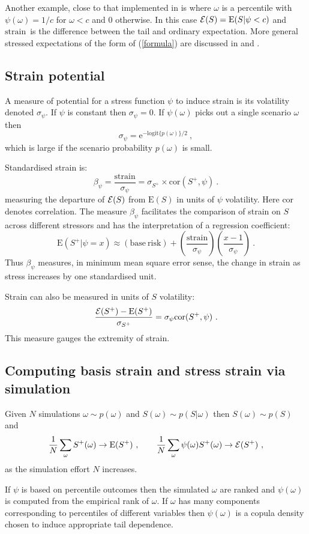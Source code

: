 \documentclass[authoryear]{elsarticle}
\newcommand{\logit}{\mathrm{logit}}
\newcommand{\E}{\mathrm{E}}
\newcommand{\e}{\mathrm{e}}
\newcommand{\Ex}{{\cal E}}
\newcommand{\Es}{\Ex}
\newcommand{\cor}{\mathrm{cor}}
\newcommand{\br}{\ensuremath{\mathrm{base\ risk}}}
\newcommand{\st}{\ensuremath{\mathrm{strain}}}
\newcommand{\pr}{\ensuremath{\mathrm{strain}}}
\newcommand{\eref}[1]{(\ref{#1})}
\newcommand{\cq}{\ , \qquad}
\begin{document}
Another example, close to that implemented in \cite{brownlees2015} is where $\omega$ is a percentile with $\psi(\omega)=1/c$ for $\omega<c$ and 0 otherwise.   In this case  $\Es(S)=\E(S|\psi<c)$ and \pr\  is the difference between the   tail and ordinary expectation.
More general stressed expectations of the form of \eref{formula} are discussed in \cite{furman2008weighted1} and \cite{choo2010determining}.

\subsection{Strain potential} 

A  measure of potential for a stress function $\psi$ to induce strain is its volatility denoted $\sigma_\psi$. If $\psi$ is constant then $\sigma_\psi=0$.   If $\psi(\omega)$ picks out a single scenario $\omega$ then 
$$
\sigma_\psi= \e^{-\logit\{p(\omega)\}/2}\ ,
$$
which is large if the scenario probability $p(\omega)$ is small. 

Standardised strain is: 
$$
\beta_\psi= \frac{\mathrm{strain}}{\sigma_\psi}=\sigma_{S^+} \times\cor(S^+,\psi)\ .
$$
measuring the departure of $\Es(S)$ from $\E(S)$ in units of $\psi$ volatility. Here $\cor$ denotes correlation. The measure $\beta_\psi$ facilitates the comparison of strain on $S$ across different stressors and has the interpretation of a regression coefficient:
$$
\E(S^+|\psi=x) \approx (\br) +\left(\frac{\st}{\sigma_\psi}\right)\left(\frac{x-1}{\sigma_\psi}\right)\ .
$$
Thus $\beta_\psi$ measures, in minimum mean square error sense, the change in strain as stress increases by one standardised unit.

 Strain can also be measured  in units of $S$ volatility:
$$
\frac{\Es(S^+)-\E(S^+)}{\sigma_{S^+}}=\sigma_\psi\cor(S^+,\psi)\ .
$$
This measure gauges the extremity of strain.

\subsection{Computing basis strain and stress strain via simulation}
Given $N$ simulations $\omega\sim p(\omega)$ and $S(\omega)\sim p(S|\omega)$  then  $S(\omega)\sim p(S)$ and  
$$
 \frac{1}{N}\sum_\omega S^+(\omega)\rightarrow \E(S^+) \cq \frac{1}{N}\sum_\omega \psi(\omega)S^+(\omega)\rightarrow \Ex(S^+) \ ,
$$
as the simulation effort $N$ increases.

If $\psi$ is based  on percentile outcomes   then the simulated $\omega$ are ranked and $\psi(\omega)$ is computed from the empirical rank of $\omega$.  If $\omega$ has many components corresponding to percentiles of different variables then $\psi(\omega)$ is a copula density chosen to induce appropriate  tail dependence.
\end{document}
